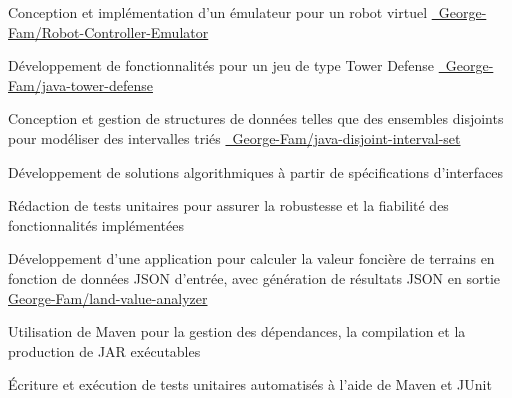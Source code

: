 \documentclass[letterpaper,10pt]{article}
\begin{document}
    \begin{resume_list}
      \item Conception et implémentation d’un émulateur pour un robot virtuel \href{https://github.com/George-Fam/Robot-Controller-Emulator}{\faGithubSquare\ George-Fam/Robot-Controller-Emulator}
      \vspace{2pt}
      \item Développement de fonctionnalités pour un jeu de type Tower Defense \href{https://github.com/George-Fam/java-tower-defense}{\faGithubSquare\ George-Fam/java-tower-defense}
      \vspace{2pt}
      \item Conception et gestion de structures de données telles que des ensembles disjoints pour modéliser des intervalles triés \href{https://github.com/George-Fam/java-disjoint-interval-set}{\faGithubSquare\ George-Fam/java-disjoint-interval-set}
      \vspace{2pt}
      \item Développement de solutions algorithmiques à partir de spécifications d’interfaces
      \vspace{2pt}
      \item Rédaction de tests unitaires pour assurer la robustesse et la fiabilité des fonctionnalités implémentées
    \end{resume_list}

  \begin{resume_list}
  \item Développement d’une application pour calculer la valeur foncière de terrains en fonction de données JSON d’entrée, avec génération de résultats JSON en sortie \href{https://github.com/George-Fam/land-value-analyzer}{\faGithubSquare George-Fam/land-value-analyzer}

    \vspace{2pt}
    \item Utilisation de Maven pour la gestion des dépendances, la compilation et la production de JAR exécutables
    \vspace{2pt}
    \item Écriture et exécution de tests unitaires automatisés à l'aide de Maven et JUnit
  \end{resume_list}
  
\end{document}
